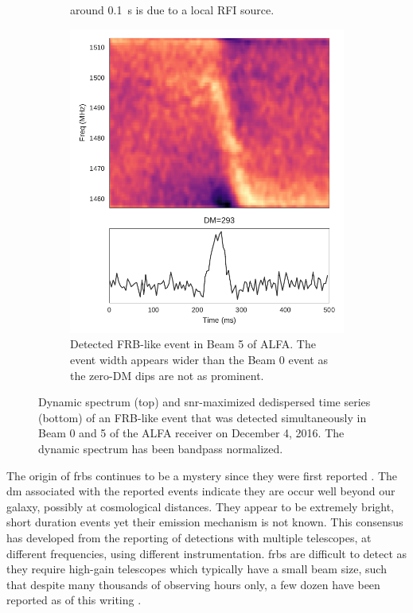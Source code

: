 \documentclass[a4paper,fleqn,usenatbib]{mnras}
\begin{document}
\begin{figure}
\begin{subfigure}[t]{0.45\textwidth}
{        around 0.1~s is due to a local RFI source.}
        \label{fig:beam0_dynamic_spec}
    \end{subfigure}
    \begin{subfigure}[t]{0.45\textwidth}
        \centering\captionsetup{width=.95\linewidth}
        \includegraphics[width=1.0\textwidth]{figures/D20161204_buf4_Beam5.pdf}
        \caption{Detected FRB-like event in Beam 5 of ALFA. The event width
        appears wider than the Beam 0 event as the zero-DM dips are not as
        prominent.
        }
        \label{fig:beam5_dynamic_spec}
    \end{subfigure}
    \caption{
    Dynamic spectrum (top) and \gls{snr}-maximized dedispersed time series
    (bottom) of an FRB-like event that was detected simultaneously in Beam 0 and
    5 of the ALFA receiver on December 4, 2016. The dynamic spectrum has been
    bandpass normalized.
    }
    \label{fig:dynamic_spec}
\end{figure}

The origin of \glspl{frb} continues to be a mystery since they were first
reported \citep{2007Sci...318..777L}. The \gls{dm} associated with the reported
events indicate they are occur well beyond our galaxy, possibly at cosmological
distances. They appear to be extremely bright, short duration events yet their
emission mechanism is not known.  This consensus has developed from the
reporting of detections with multiple telescopes, at different frequencies,
using different instrumentation. \glspl{frb} are difficult to detect as they
require high-gain telescopes which typically have a small beam size, such that
despite many thousands of observing hours only, a few dozen have been reported
as of this writing \citep{2016PASA...33...45P}.
\end{document}
